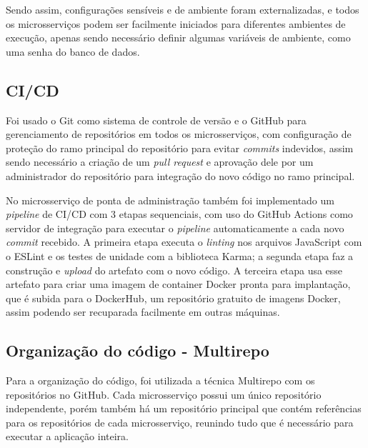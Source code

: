 
Sendo assim, configurações sensíveis e de ambiente foram externalizadas, e todos os microsserviços podem ser facilmente iniciados para diferentes ambientes de execução, apenas sendo necessário definir algumas variáveis de ambiente, como uma senha do banco de dados.


\subsection{CI/CD}
Foi usado o Git como sistema de controle de versão e o GitHub para gerenciamento de repositórios em todos os microsserviços, com configuração de proteção do ramo principal do repositório para evitar \emph{commits} indevidos, assim sendo necessário a criação de um \emph{pull request} e aprovação dele por um administrador do repositório para integração do novo código no ramo principal. 

No microsserviço de ponta de administração também foi implementado um \emph{pipeline} de CI/CD com 3 etapas sequenciais, com uso do GitHub Actions como servidor de integração para executar o \emph{pipeline} automaticamente a cada novo \emph{commit} recebido. A primeira etapa executa o \emph{linting} nos arquivos JavaScript com o ESLint e os testes de unidade com a biblioteca Karma; a segunda etapa faz a construção e \emph{upload} do artefato com o novo código. A terceira etapa usa esse artefato para criar uma imagem de container Docker pronta para implantação, que é subida para o DockerHub, um repositório gratuito de imagens Docker, assim podendo ser recuparada facilmente em outras máquinas. 


\subsection{Organização do código - Multirepo}
Para a organização do código, foi utilizada a técnica Multirepo com os repositórios no GitHub. Cada microsserviço possui um único repositório independente, porém também há um repositório principal que contém referências para os repositórios de cada microsserviço, reunindo tudo que é necessário para executar a aplicação inteira.

